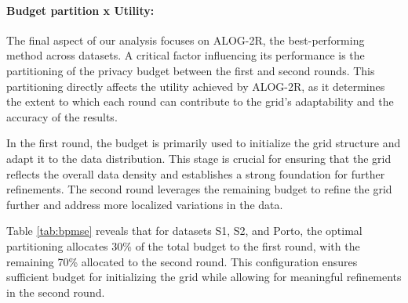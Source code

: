 

\paragraph{Budget partition x Utility:}The final aspect of our analysis focuses on ALOG-2R, the best-performing method across datasets. A critical factor influencing its performance is the partitioning of the privacy budget between the first and second rounds. This partitioning directly affects the utility achieved by ALOG-2R, as it determines the extent to which each round can contribute to the grid's adaptability and the accuracy of the results.

In the first round, the budget is primarily used to initialize the grid structure and adapt it to the data distribution. This stage is crucial for ensuring that the grid reflects the overall data density and establishes a strong foundation for further refinements. The second round leverages the remaining budget to refine the grid further and address more localized variations in the data.

Table \ref{tab:bpmse} reveals that for datasets S1, S2, and Porto, the optimal partitioning allocates 30\% of the total budget to the first round, with the remaining 70\% allocated to the second round. This configuration ensures sufficient budget for initializing the grid while allowing for meaningful refinements in the second round.


